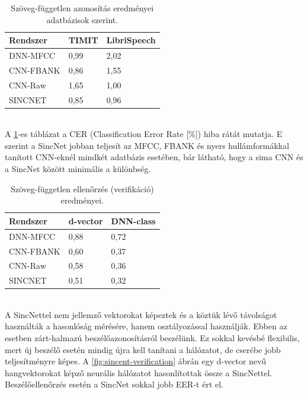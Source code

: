 \newline
\begin{table}[!ht]
	\begin{tabular}{*3l} \toprule
		\bfseries Rendszer & \bfseries TIMIT & \bfseries LibriSpeech \\ \midrule
		DNN-MFCC & 0,99 & 2,02 \\
		\rowcolor{gray!10} 
		CNN-FBANK & 0,86 & 1,55 \\
		CNN-Raw  & 1,65 & 1,00 \\
		\rowcolor{gray!10} 
		SINCNET & 0,85 & 0,96 \\
		\bottomrule
		\hline
	\end{tabular}
	\centering
	\caption{Szöveg-független azonosítás eredményei adatbázisok szerint.}
	\label{fig:sincnet-identification}
\end{table}
\ \\
A \ref{fig:sincnet-identification}-es táblázat a CER (Classification Error Rate [\%]) hiba rátát mutatja. E szerint a SincNet jobban teljesít az MFCC, FBANK és nyers hullámformákkal tanított CNN-eknél mindkét adatbázis esetében, bár látható, hogy a sima CNN és a SincNet között minimális a különbség.
\newline
\begin{table}[!ht]
	\begin{tabular}{*3l} \toprule
		\bfseries Rendszer & \bfseries d-vector & \bfseries DNN-class \\ \midrule
		DNN-MFCC & 0,88 & 0,72 \\
		\rowcolor{gray!10} 
		CNN-FBANK & 0,60 & 0,37 \\
		CNN-Raw  & 0,58 & 0,36 \\
		\rowcolor{gray!10} 
		SINCNET & 0,51 & 0,32 \\
		\bottomrule
		\hline
	\end{tabular}
	\centering
	\caption{Szöveg-független ellenőrzés (verifikáció) eredményei.}
	\label{fig:sincnet-verification}
\end{table}
\ \\
\newline
A SincNettel nem jellemző vektorokat képeztek és a köztük lévő távolságot használták a hasonlóság mérésére, hanem osztályozással használják. Ebben az esetben zárt-halmazú beszélőazonosításról beszélünk. Ez sokkal kevésbé flexibilis, mert új beszélő esetén mindig újra kell tanítani a hálózatot, de cserébe jobb teljesítményre képes. A \ref{fig:sincent-verification} ábrán egy d-vector nevű hangvektorokat képző neurális hálózatot hasonlítottak össze a SincNettel. Beszélőellenőrzés esetén a SincNet sokkal jobb EER-t ért el.

